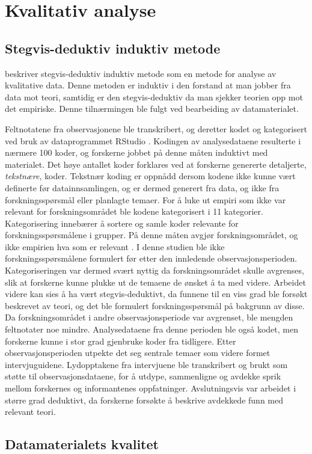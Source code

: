 \section{Kvalitativ analyse}
\label{section:kvalitativ_analyse} 

\subsection{Stegvis-deduktiv induktiv metode}
\citet{Tjora} beskriver stegvis-deduktiv induktiv metode som en metode for analyse
av kvalitative data. Denne metoden er induktiv i den forstand at man jobber fra
data mot teori, samtidig er den stegvis-deduktiv da man sjekker teorien opp mot det
empiriske. Denne tilnærmingen ble fulgt ved bearbeiding av datamaterialet.

\noindent
Feltnotatene fra observasjonene ble transkribert, og deretter kodet og kategorisert ved bruk av dataprogrammet RStudio \citep{Rstudio}. Kodingen av analysedataene resulterte i nærmere 100 koder, og forskerne jobbet på denne måten induktivt med materialet. Det høye antallet koder forklares ved at forskerne genererte detaljerte, \textit{tekstnære}, koder. Tekstnær koding er oppnådd dersom kodene ikke kunne vært definerte før datainnsamlingen, og er dermed generert fra data, og ikke fra forskningsspørsmål eller planlagte temaer. For å luke ut empiri som ikke var relevant for forskningsområdet ble kodene kategorisert i 11 kategorier. Kategorisering innebærer å sortere og samle koder relevante for forskningsspørsmålene i grupper. På denne måten avgjør forskningsområdet, og ikke empirien hva som er relevant \citep{Tjora}. I denne studien ble ikke forskningsspørsmålene formulert før etter den innledende observasjonsperioden. Kategoriseringen var dermed svært nyttig da forskningsområdet skulle avgrenses, slik at forskerne kunne plukke ut de temaene de ønsket å ta med videre. Arbeidet videre kan sies å ha vært stegvis-deduktivt, da funnene til en viss grad ble forsøkt beskrevet av teori, og det ble formulert forskningsspørsmål på bakgrunn av disse. Da forskningsområdet i andre observasjonsperiode var avgrenset, ble mengden feltnotater noe mindre. Analysedataene fra denne perioden ble også kodet, men forskerne kunne i stor grad gjenbruke koder fra tidligere. Etter observasjonsperioden utpekte det seg sentrale temaer som videre formet intervjuguidene. Lydopptakene fra intervjuene ble transkribert og brukt som støtte til observasjonsdataene, for å utdype, sammenligne og avdekke sprik mellom forskernes og informantenes oppfatninger. Avslutningsvis var arbeidet i større grad deduktivt, da forskerne forsøkte å beskrive avdekkede funn med relevant teori.

\subsection{Datamaterialets kvalitet}

